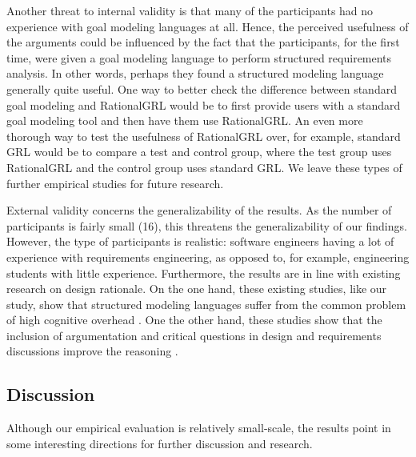 Another threat to internal validity is that many of the participants had no experience with goal modeling languages at all. Hence, the perceived usefulness of the arguments could be influenced by the fact that the participants, for the first time, were given a goal modeling language to perform structured requirements analysis. In other words, perhaps they found a structured modeling language generally quite useful. One way to better check the difference between standard goal modeling and RationalGRL would be to first provide users with a standard goal modeling tool and then have them use RationalGRL. An even more thorough way to test the usefulness of RationalGRL over, for example, standard GRL would be to compare a test and control group, where the test group uses RationalGRL and the control group uses standard GRL. We leave these types of further empirical studies for future research.

External validity concerns the generalizability of the results. As the number of participants is fairly small (16), this threatens the generalizability of our findings. However, the type of participants is realistic: software engineers having a lot of experience with requirements engineering, as opposed to, for example, engineering students with little experience. Furthermore, the results are in line with existing research on design rationale. On the one hand, these existing studies, like our study, show that structured modeling languages suffer from the common problem of high cognitive overhead \cite{shum2006hypermedia}. One the other hand, these studies show that the inclusion of argumentation and critical questions in design and requirements discussions improve the reasoning \cite{razavian2016two,TangEtal2018}.

\subsection{Discussion}
Although our empirical evaluation is relatively small-scale, the results point in some interesting directions for further discussion and research. 

